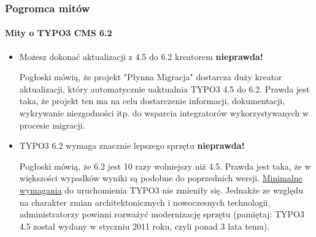 \begin{frame}[fragile]
	\frametitle{Pogromca mitów}
	\framesubtitle{Mity o TYPO3 CMS 6.2}

	\begin{itemize}
		\item Możesz dokonać aktualizacji z 4.5 do 6.2 kreatorem
			\tabto{9cm}\color{red}\textbf{\textrightarrow nieprawda!}\color{black}

			\smaller
				Pogłoski mówią, że projekt "Płynna Migracja" dostarcza duży kreator aktualizacji, który automatycznie uaktualnia TYPO3 4.5 do 6.2. Prawda jest taka, że projekt ten ma na celu dostarczenie informacji, dokumentacji, wykrywanie niezgodności itp. do wsparcia integratorów wykorzystywanych w procesie migracji.
			\normalsize

		\item TYPO3 6.2 wymaga znacznie lepszego sprzętu
			\tabto{9cm}\color{red}\textbf{\textrightarrow nieprawda!}\color{black}

			\smaller
				Pogłoski mówią, że 6.2 jest 10 razy wolniejszy niż 4.5. Prawda jest taka, że w większości wypadków wyniki są podobne do poprzednich wersji. \href{http://typo3.org/about/typo3-the-cms/system-requirements/}{Minimalne wymagania} do uruchomienia TYPO3 nie zmieniły się. Jednakże ze względu na charakter zmian architektonicznych i nowoczesnych technologii, administratorzy powinni rozważyć modernizację sprzętu (pamiętaj: TYPO3 4.5 został wydany w styczniu 2011 roku, czyli ponad 3 lata temu).
			\normalsize

	\end{itemize}

\end{frame}


